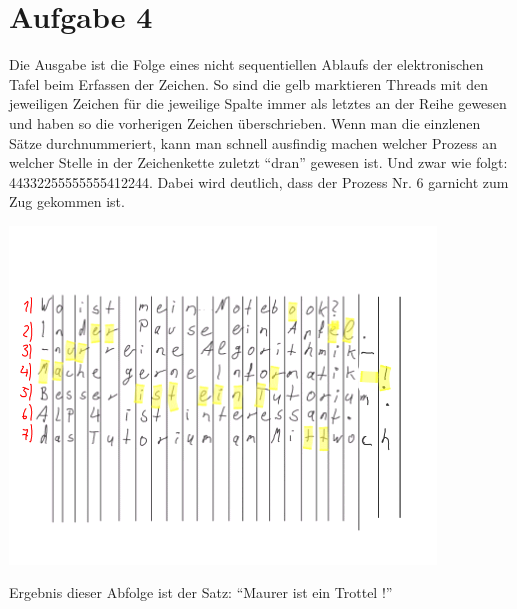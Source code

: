 \documentclass[11pt,a4paper,DIV=10,]{scrartcl}
\begin{document}
\section*{Aufgabe 4}
Die Ausgabe ist die Folge eines nicht sequentiellen Ablaufs der elektronischen Tafel beim Erfassen der Zeichen. So sind die gelb marktieren Threads mit den jeweiligen Zeichen für die jeweilige Spalte immer als letztes an der Reihe gewesen und haben so die vorherigen Zeichen überschrieben. Wenn man die einzlenen Sätze durchnummeriert, kann man schnell ausfindig machen welcher Prozess an welcher Stelle in der Zeichenkette zuletzt ``dran'' gewesen ist. Und zwar wie folgt: 44332255555555412244. Dabei wird deutlich, dass der Prozess Nr. 6 garnicht zum Zug gekommen ist. 

\includegraphics{picture_a4.png}

Ergebnis dieser Abfolge ist der Satz: ``Maurer ist ein Trottel !''



\end{document}
